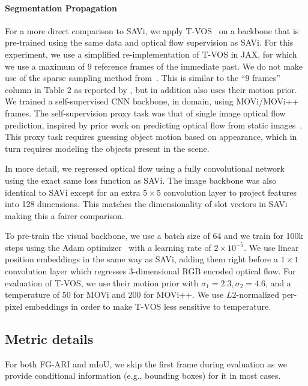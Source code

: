\documentclass{article}
\newcommand{\modelname}{SAVi\xspace}
\begin{document}
\paragraph{Segmentation Propagation}\label{sec:appendix:baseline:seg_prop}
For a more direct comparison to SAVi, we apply T-VOS~\citep{zhang2020transductive} on a backbone that is pre-trained using the same data and optical flow supervision as SAVi. For this experiment, we use a simplified re-implementation of T-VOS in JAX, for which we use a maximum of 9 reference frames of the immediate past. We do not make use of the sparse sampling method from~\citep{zhang2020transductive}. This is similar to the ``9 frames'' column in Table 2 as reported by \citet{zhang2020transductive}, but in addition also uses their motion prior. We trained a self-supervised CNN backbone, in domain, using MOVi/MOVi++ frames. The self-supervision proxy task was that of single image optical flow prediction, inspired by prior work on predicting optical flow from static images~\citep{mahendran2018cross,walker2015dense}. This proxy task requires guessing object motion based on appearance, which in turn requires modeling the objects present in the scene.

In more detail, we regressed optical flow using a fully convolutional network~\citep{long2015fully} using the exact same loss function as \modelname. The image backbone was also identical to \modelname except for an extra $5\times 5$ convolution layer to project features into 128 dimensions. This matches the dimensionality of slot vectors in \modelname making this a fairer comparison.

To pre-train the visual backbone, we use a batch size of 64 and we train for 100k steps using the Adam optimizer~\citep{kingma2014adam} with a learning rate of $2\times 10^{-5}$. We use linear position embeddings in the same way as \modelname, adding them right before a $1\times 1$ convolution layer which regresses 3-dimensional RGB encoded optical flow. For evaluation of T-VOS, we use their motion prior with $\sigma_1 = 2.3, \sigma_2 = 4.6$, and a temperature of $50$ for MOVi and $200$ for MOVi++. We use $L2$-normalized per-pixel embeddings in order to make T-VOS less sensitive to temperature.

\subsection{Metric details}
\label{app:metrics}
For both FG-ARI and mIoU, we skip the first frame during evaluation as we provide conditional information (e.g., bounding boxes) for it in most cases. 
\end{document}
